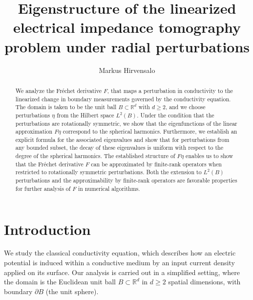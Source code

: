 \documentclass[reqno]{amsart}
\numberwithin{equation}{section}
\numberwithin{figure}{section}
\numberwithin{table}{section}
\theoremstyle{plain}
\theoremstyle{definition}
\theoremstyle{remark}
\newcommand{\R}{\mathbb{R}}
\newcommand{\sphe}{{\partial B}}
\begin{document}
\title[Linearized problem of electrical impedance tomography]{Eigenstructure of the linearized electrical impedance tomography problem under radial perturbations}
%


\author[M.~Hirvensalo]{Markus Hirvensalo}
\address[M.~Hirvensalo]{Department of Mathematics and Systems Analysis, Aalto University, P.O. Box~11100, 00076 Helsinki, Finland.}
%


\begin{abstract}
    We analyze the Fr\'echet derivative \( F \), that maps a perturbation in conductivity to the linearized change in boundary measurements governed by the conductivity equation. 
    The domain is taken to be the unit ball \( B \subset \R^d \) with \( d \geq 2 \), and we choose perturbations \( \eta \) from the Hilbert space \( L^2(B) \).
    Under the condition that the perturbations are rotationally symmetric, we show that the eigenfunctions of the linear approximation \( F \eta \) correspond to the spherical harmonics.
    Furthermore, we establish an explicit formula for the associated eigenvalues and show that for perturbations from any bounded subset, the decay of these eigenvalues is uniform with respect to the degree of the spherical harmonics.
    The established structure of \( F \eta \) enables us to show that the Fr\'echet derivative \( F \) can be approximated by finite-rank operators when restricted to rotationally symmetric perturbations.
    Both the extension to \( L^2(B) \) perturbations and the approximability by finite-rank operators are favorable properties for further analysis of \( F \) in numerical algorithms.
\end{abstract}
%


\maketitle
%


\section{Introduction} \label{sec:intro}


We study the classical conductivity equation, which describes how an electric potential is induced within a conductive medium by an input current density applied on its surface. 
%
Our analysis is carried out in a simplified setting, where the domain is the Euclidean unit ball \( B \subset \R^d \) in \( d \geq 2 \) spatial dimensions, with boundary \( \sphe \) (the unit sphere).
%
\end{document}
